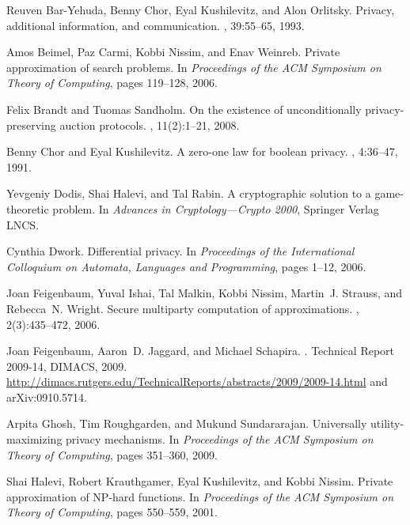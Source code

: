 \documentclass{article}
\theoremstyle{theorem}
\theoremstyle{definition}
\theoremstyle{remark}
\begin{document}
\begin{thebibliography}{10}

Reuven Bar-Yehuda, Benny Chor, Eyal Kushilevitz, and Alon Orlitsky.
\newblock Privacy, additional information, and communication.
, 39:55--65, 1993.

Amos Beimel, Paz Carmi, Kobbi Nissim, and Enav Weinreb.
\newblock Private approximation of search problems.
\newblock In {\em Proceedings of the ACM Symposium on Theory of Computing},
  pages 119--128, 2006.

Felix Brandt and Tuomas Sandholm.
\newblock On the existence of unconditionally privacy-preserving auction
  protocols.
, 11(2):1--21, 2008.

Benny Chor and Eyal Kushilevitz.
\newblock A zero-one law for boolean privacy.
, 4:36--47, 1991.

Yevgeniy Dodis, Shai Halevi, and Tal Rabin.
\newblock A cryptographic solution to a game-theoretic problem.
\newblock In {\em Advances in Cryptology---Crypto 2000}, Springer Verlag LNCS.

Cynthia Dwork.
\newblock Differential privacy.
\newblock In {\em Proceedings of the International Colloquium on Automata,
  Languages and Programming}, pages 1--12, 2006.

Joan Feigenbaum, Yuval Ishai, Tal Malkin, Kobbi Nissim, Martin~J. Strauss, and
  Rebecca~N. Wright.
\newblock Secure multiparty computation of approximations.
, 2(3):435--472, 2006.

Joan Feigenbaum, Aaron~D. Jaggard, and Michael Schapira.
.
\newblock Technical Report 2009-14, DIMACS, 2009.
\newblock
  \url{http://dimacs.rutgers.edu/TechnicalReports/abstracts/2009/2009-14.html}
  and arXiv:0910.5714.

Arpita Ghosh, Tim Roughgarden, and Mukund Sundararajan.
\newblock Universally utility-maximizing privacy mechanisms.
\newblock In {\em Proceedings of the ACM Symposium on Theory of Computing},
  pages 351--360, 2009.

Shai Halevi, Robert Krauthgamer, Eyal Kushilevitz, and Kobbi Nissim.
\newblock Private approximation of {NP}-hard functions.
\newblock In {\em Proceedings of the ACM Symposium on Theory of Computing},
  pages 550--559, 2001.


\end{thebibliography}
\end{document}
